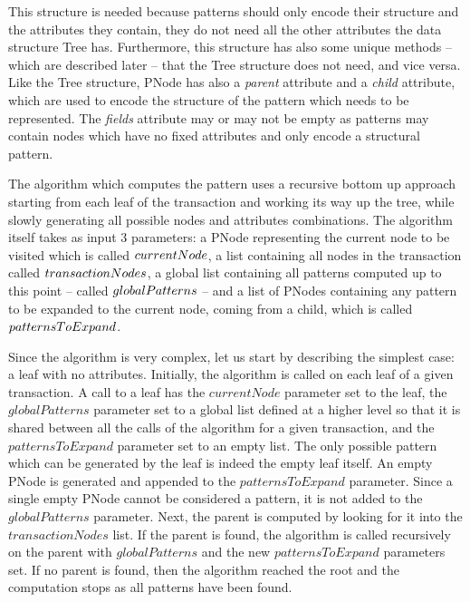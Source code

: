\documentclass{acm_proc_article-sp-sigmod09}
\begin{document}
This structure is needed because patterns should only encode their structure and the attributes they contain, they do not need all the other attributes the data structure Tree has. Furthermore, this structure has also some unique methods -- which are described later -- that the Tree structure does not need, and vice versa. Like the Tree structure, PNode has also a \emph{parent} attribute and a \emph{child} attribute, which are used to encode the structure of the pattern which needs to be represented. The \emph{fields} attribute may or may not be empty as patterns may contain nodes which have no fixed attributes and only encode a structural pattern.

The algorithm which computes the pattern uses a recursive bottom up approach starting from each leaf of the transaction and working its way up the tree, while slowly generating all possible nodes and attributes combinations. The algorithm itself takes as input 3 parameters: a PNode representing the current node to be visited which is called $current\-Node$, a list containing all nodes in the transaction called $transaction\-Nodes$, a global list containing all patterns computed up to this point -- called $global\-Patterns$ -- and a list of PNodes containing any pattern to be expanded to the current node, coming from a child, which is called $patterns\-To\-Expand$.

Since the algorithm is very complex, let us start by describing the simplest case: a leaf with no attributes. Initially, the algorithm is called on each leaf of a given transaction. A call to a leaf has the $currentNode$ parameter set to the leaf, the $globalPatterns$ parameter set to a global list defined at a higher level so that it is shared between all the calls of the algorithm for a given transaction, and the $patternsToExpand$ parameter set to an empty list. The only possible pattern which can be generated by the leaf is indeed the empty leaf itself. An empty PNode is generated and appended to the $patternsToExpand$ parameter. Since a single empty PNode cannot be considered a pattern, it is not added to the $globalPatterns$ parameter. Next, the parent is computed by looking for it into the $transactionNodes$ list. If the parent is found, the algorithm is called recursively on the parent with $globalPatterns$ and the new $patternsToExpand$ parameters set. If no parent is found, then the algorithm reached the root and the computation stops as all patterns have been found.
\end{document}
